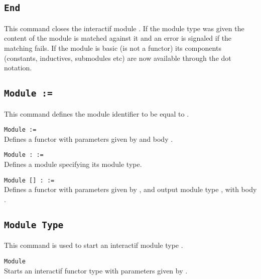 \subsection{\tt End {\ident}}
This command closes the interactif module {\ident}. If the module type
was given the content of the module is matched against it and an error
is signaled if the matching fails. If the module is basic (is not a
functor) its components (constants, inductives, submodules etc) are
now available through the dot notation.

\begin{ErrMsgs}
\item {}
\item {}
\item {}
\end{ErrMsgs}


\subsection{\tt Module {\ident} := {\modexpr}}
This command defines the module identifier {\ident} to be equal to \modexpr.

\begin{Variants}
\item{\tt Module \ident [\modbindings] := {\modexpr}}\\
  Defines a functor with parameters given by {\modbindings} and body \modexpr.
\item{\tt Module {\ident} \verb.:. {\modtype} := {\modexpr}}\\
  Defines a module specifying its module type.
\item{\tt Module {\ident} [\modbindings] \verb.:. {\modtype} := {\modexpr}}\\
  Defines a functor with parameters given by {\modbindings}, and
  output module type \modtype, with body {\modexpr}.
\end{Variants}

\subsection{\tt Module Type {\ident}}
This command is used to start an interactif module type {\ident}.

\begin{Variants}
\item{\tt Module \ident [\modbindings]}\\
  Starts an interactif functor type with parameters given by {\modbindings}.
\end{Variants}

